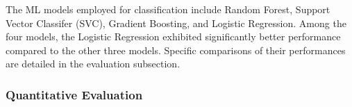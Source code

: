 
The ML models employed for classification include Random Forest, Support Vector Classifer (SVC), Gradient Boosting, and Logistic Regression. Among the four models, the Logistic Regression exhibited significantly better performance compared to the other three models. Specific comparisons of their performances are detailed in the evaluation subsection. 



\subsubsection{Quantitative Evaluation}


